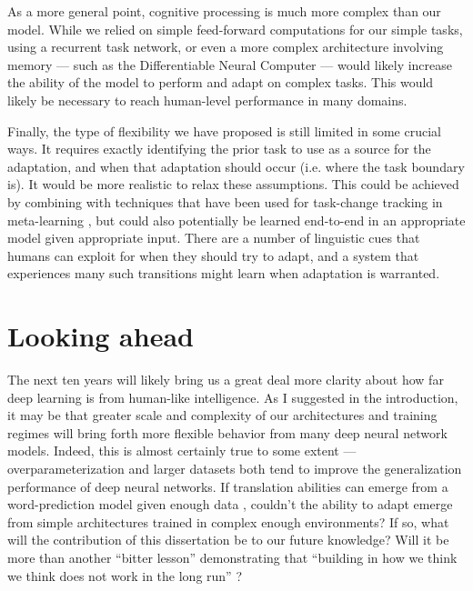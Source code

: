 As a more general point, cognitive processing is much more complex than our model. While we relied on simple feed-forward computations for our simple tasks, using a recurrent task network, or even a more complex architecture involving memory --- such as the Differentiable Neural Computer \citep{Graves2016} --- would likely increase the ability of the model to perform and adapt on complex tasks. This would likely be necessary to reach human-level performance in many domains.\par 

Finally, the type of flexibility we have proposed is still limited in some crucial ways. It requires exactly identifying the prior task to use as a source for the adaptation, and when that adaptation should occur (i.e. where the task boundary is). It would be more realistic to relax these assumptions. This could be achieved by combining with techniques that have been used for task-change tracking in meta-learning \citep[e.g.][]{Nagabandi2019}, but could also potentially be learned end-to-end in an appropriate model given appropriate input. There are a number of linguistic cues that humans can exploit for when they should try to adapt, and a system that experiences many such transitions might learn when adaptation is warranted. \par 


\section{Looking ahead}

The next ten years will likely bring us a great deal more clarity about how far deep learning is from human-like intelligence. As I suggested in the introduction, it may be that greater scale and complexity of our architectures and training regimes will bring forth more flexible behavior from many deep neural network models. Indeed, this is almost certainly true to some extent --- overparameterization and larger datasets both tend to improve the generalization performance of deep neural networks. If translation abilities can emerge from a word-prediction model given enough data \citep{Radford2019}, couldn't the ability to adapt emerge from simple architectures trained in complex enough environments? If so, what will the contribution of this dissertation be to our future knowledge? Will it be more than another ``bitter lesson'' demonstrating that ``building in how we think we think does not work in the long run'' \citep{Sutton2019}? \par 

